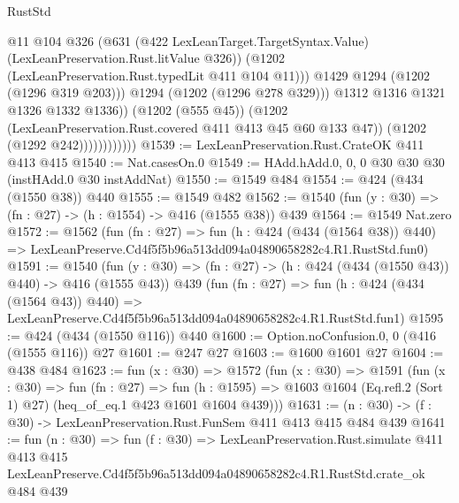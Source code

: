 \begin{lexlean}{RustStd}
\begin{coremodule}
                                  @11
                                  @104
                                  @326
                                  (@631
                                    (@422 LexLeanTarget.TargetSyntax.Value)
                                    (LexLeanPreservation.Rust.litValue @326))
                                  (@1202 (LexLeanPreservation.Rust.typedLit @411 @104 @11)))
                                @1429
                                @1294
                                (@1202 (@1296 @319 @203)))
                              @1294
                              (@1202 (@1296 @278 @329)))
                            @1312
                            @1316
                            @1321
                            @1326
                            @1332
                            @1336))
                        (@1202 (@555 @45))
                        (@1202 (LexLeanPreservation.Rust.covered @411 @413 @45 @60 @133 @47))
                        (@1202 (@1292 @242))))))))))))
@1539 := LexLeanPreservation.Rust.CrateOK @411 @413 @415
@1540 := Nat.casesOn.{0}
@1549 := HAdd.hAdd.{0, 0, 0} @30 @30 @30 (instHAdd.{0} @30 instAddNat)
@1550 := @1549 @484
@1554 := @424 (@434 (@1550 @38)) @440
@1555 := @1549 @482
@1562 := @1540 (fun (y : @30) => (fn : @27) -> (h : @1554) -> @416 (@1555 @38)) @439
@1564 := @1549 Nat.zero
@1572 := @1562
    (fun (fn : @27) =>
    fun (h : @424 (@434 (@1564 @38)) @440) =>
    LexLeanPreserve.Cd4f5f5b96a513dd094a04890658282c4.R1.RustStd.fun0)
@1591 := @1540
    (fun (y : @30) => (fn : @27) -> (h : @424 (@434 (@1550 @43)) @440) -> @416 (@1555 @43))
    @439
    (fun (fn : @27) =>
    fun (h : @424 (@434 (@1564 @43)) @440) =>
    LexLeanPreserve.Cd4f5f5b96a513dd094a04890658282c4.R1.RustStd.fun1)
@1595 := @424 (@434 (@1550 @116)) @440
@1600 := Option.noConfusion.{0, 0} (@416 (@1555 @116)) @27
@1601 := @247 @27
@1603 := @1600 @1601 @27
@1604 := @438 @484
@1623 := fun (x : @30) =>
  @1572
    (fun (x : @30) =>
    @1591
      (fun (x : @30) =>
      fun (fn : @27) =>
      fun (h : @1595) =>
      @1603 @1604 (Eq.refl.{2} (Sort 1) @27) (heq_of_eq.{1} @423 @1601 @1604 @439)))
@1631 := (n : @30) -> (f : @30) -> LexLeanPreservation.Rust.FunSem @411 @413 @415 @484 @439
@1641 := fun (n : @30) =>
  fun (f : @30) =>
  LexLeanPreservation.Rust.simulate
    @411
    @413
    @415
    LexLeanPreserve.Cd4f5f5b96a513dd094a04890658282c4.R1.RustStd.crate_ok
    @484
    @439
\end{coremodule}
\end{lexlean}
